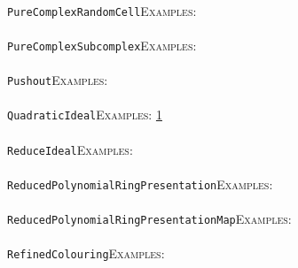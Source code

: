 \documentclass[a4paper,11pt]{report}
\begin{document}
{{ \\
 \texttt{PureComplexRandomCell}{\nobreakspace}{\nobreakspace}{\nobreakspace}{\nobreakspace}\textsc{Examples:} \\
 \\
 \texttt{PureComplexSubcomplex}{\nobreakspace}{\nobreakspace}{\nobreakspace}{\nobreakspace}\textsc{Examples:} \\
 \\
 \texttt{Pushout}{\nobreakspace}{\nobreakspace}{\nobreakspace}{\nobreakspace}\textsc{Examples:} \\
 \\
 \texttt{QuadraticIdeal}{\nobreakspace}{\nobreakspace}{\nobreakspace}{\nobreakspace}\textsc{Examples:} \href{tutorial/chap10.html} {1}{\nobreakspace} \\
 \\
 \texttt{ReduceIdeal}{\nobreakspace}{\nobreakspace}{\nobreakspace}{\nobreakspace}\textsc{Examples:} \\
 \\
 \texttt{ReducedPolynomialRingPresentation}{\nobreakspace}{\nobreakspace}{\nobreakspace}{\nobreakspace}\textsc{Examples:} \\
 \\
 \texttt{ReducedPolynomialRingPresentationMap}{\nobreakspace}{\nobreakspace}{\nobreakspace}{\nobreakspace}\textsc{Examples:} \\
 \\
 \texttt{RefinedColouring}{\nobreakspace}{\nobreakspace}{\nobreakspace}{\nobreakspace}\textsc{Examples:} \\
 \\
}}
\end{document}

